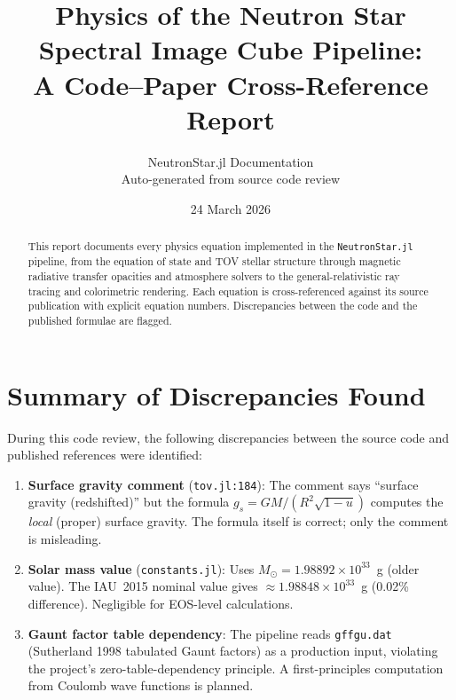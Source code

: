 \documentclass[11pt,a4paper]{article}
\title{Physics of the Neutron Star Spectral Image Cube Pipeline:\\
  A Code--Paper Cross-Reference Report}
\author{NeutronStar.jl Documentation\\[4pt]
  \small Auto-generated from source code review}
\date{24 March 2026}
\begin{document}
\maketitle

\begin{abstract}
This report documents every physics equation implemented in the
\texttt{NeutronStar.jl} pipeline, from the equation of state and TOV
stellar structure through magnetic radiative transfer opacities and
atmosphere solvers to the general-relativistic ray tracing and colorimetric
rendering.  Each equation is cross-referenced against its source publication
with explicit equation numbers.  Discrepancies between the code and the
published formulae are flagged.
\end{abstract}

\tableofcontents
\newpage



\newpage


\newpage


\newpage


\newpage
\section*{Summary of Discrepancies Found}

During this code review, the following discrepancies between the source code
and published references were identified:

\begin{enumerate}
  \item \textbf{Surface gravity comment} (\texttt{tov.jl:184}):
    The comment says ``surface gravity (redshifted)'' but the formula
    $g_s = GM/(R^2\sqrt{1-u})$ computes the \emph{local} (proper) surface
    gravity.  The formula itself is correct; only the comment is misleading.

  \item \textbf{Solar mass value} (\texttt{constants.jl}):
    Uses $M_\odot = 1.98892\times10^{33}$~g (older value).  The IAU~2015
    nominal value gives $\approx1.98848\times10^{33}$~g (0.02\% difference).
    Negligible for EOS-level calculations.

  \item \textbf{Gaunt factor table dependency}:
    The pipeline reads \texttt{gffgu.dat} (Sutherland 1998 tabulated Gaunt
    factors) as a production input, violating the project's zero-table-dependency
    principle.  A first-principles computation from Coulomb wave functions is
    planned.
\end{enumerate}
\end{document}
